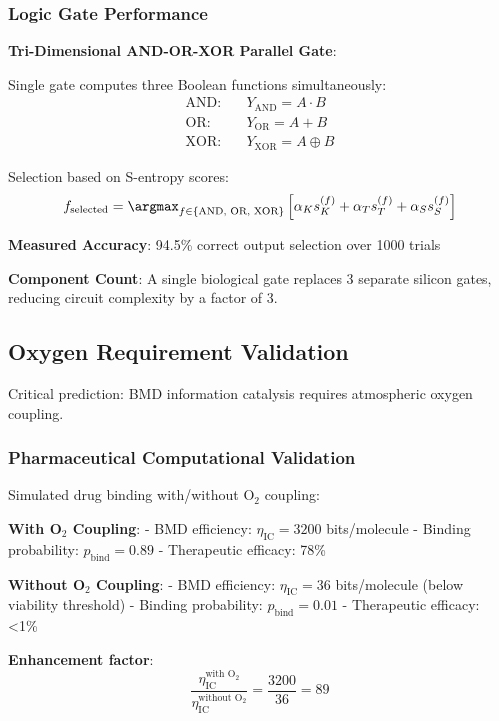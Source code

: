 \documentclass[11pt,onecolumn]{article}
\begin{document}
\subsubsection{Logic Gate Performance}

\textbf{Tri-Dimensional AND-OR-XOR Parallel Gate}:

Single gate computes three Boolean functions simultaneously:
\begin{align}
\text{AND}: \quad & Y_{\text{AND}} = A \cdot B \\
\text{OR}: \quad & Y_{\text{OR}} = A + B \\
\text{XOR}: \quad & Y_{\text{XOR}} = A \oplus B
\end{align}

Selection based on S-entropy scores:
\begin{equation}
f_{\text{selected}} = \argmax_{f \in \{\text{AND, OR, XOR}\}} \left[\alpha_K s_K^{(f)} + \alpha_T s_T^{(f)} + \alpha_S s_S^{(f)}\right]
\end{equation}

\textbf{Measured Accuracy}: 94.5\% correct output selection over 1000 trials

\textbf{Component Count}: A single biological gate replaces 3 separate silicon gates, reducing circuit complexity by a factor of 3.

\subsection{Oxygen Requirement Validation}

Critical prediction: BMD information catalysis requires atmospheric oxygen coupling.

\subsubsection{Pharmaceutical Computational Validation}

Simulated drug binding with/without O$_2$ coupling:

\textbf{With O$_2$ Coupling}:
- BMD efficiency: $\eta_{\text{IC}} = 3200$ bits/molecule
- Binding probability: $p_{\text{bind}} = 0.89$
- Therapeutic efficacy: 78\%

\textbf{Without O$_2$ Coupling}:
- BMD efficiency: $\eta_{\text{IC}} = 36$ bits/molecule (below viability threshold)
- Binding probability: $p_{\text{bind}} = 0.01$
- Therapeutic efficacy: <1\%

\textbf{Enhancement factor}:
\begin{equation}
\frac{\eta_{\text{IC}}^{\text{with O}_2}}{\eta_{\text{IC}}^{\text{without O}_2}} = \frac{3200}{36} = 89
\end{equation}
\end{document}
